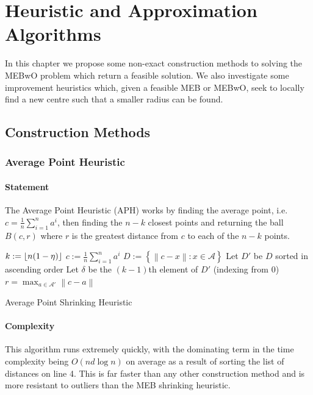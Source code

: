\documentclass[11pt,twoside]{report}
\newcommand{\A}{\mathcal{A}} %
\newcommand{\norm}[1]{\left\lVert#1\right\rVert} %
\DeclarePairedDelimiter\floor{\lfloor}{\rfloor}
\theoremstyle{definition}
\numberwithin{theorem}{section}
\numberwithin{definition}{section}
\numberwithin{lemma}{section}
\numberwithin{proposition}{section}
\numberwithin{equation}{section}
\numberwithin{figure}{section}
\begin{document}
\chapter{Heuristic and Approximation Algorithms}\label{algorithms}

In this chapter we propose some non-exact construction methods to solving the MEBwO problem which return a feasible solution. We also investigate some improvement heuristics which, given a feasible MEB or MEBwO, seek to locally find a new centre such that a smaller radius can be found.

\section{Construction Methods}
\subsection{Average Point Heuristic}
\subsubsection{Statement}
The Average Point Heuristic (APH) works by finding the average point, i.e. $c=\frac{1}{n}\sum_{i=1}^n a^i$, then finding the $n-k$ closest points and returning the ball $B(c,r)$ where $r$ is the greatest distance from $c$ to each of the $n-k$ points.

\begin{algorithm}[H]\label{avg point shrink}
    \SetAlgoLined
    \KwIn{Data set $\A$, $\eta\in[0,1]$}
    $k:=\floor{n(1-\eta)}$\;
    $c:=\frac{1}{n}\sum_{i=1}^na^i$\;
    $D:=\left\{\norm{c-x}: x\in\A\right\}$\;
    Let $D'$ be $D$ sorted in ascending order\;
    Let $\delta$ be the $(k-1)$th element of $D'$ (indexing from 0)\;
    $r = \max_{a\in\A'}\norm{c-a}$\;
    
    \caption{Average Point Shrinking Heuristic}
\end{algorithm}

\subsubsection{Complexity}
This algorithm runs extremely quickly, with the dominating term in the time complexity being $O(nd\log n)$ on average as a result of sorting the list of distances on line 4. This is far faster than any other construction method and is more resistant to outliers than the MEB shrinking heuristic.
\end{document}

